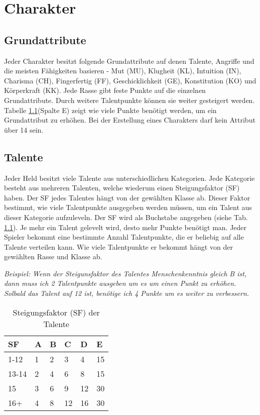 {\let\clearpage\relax\chapter{Charakter}}
\section{Grundattribute}
Jeder Charakter besitzt folgende Grundattribute auf denen Talente, Angriffe und die meisten Fähigkeiten basieren - Mut (MU), Klugheit (KL), Intuition (IN), Charisma (CH), Fingerfertig (FF), Geschicklichkeit (GE), Konstitution (KO) und Körperkraft (KK). Jede Rasse gibt feste Punkte auf die einzelnen Grundattribute. Durch weitere Talentpunkte können sie weiter gesteigert werden. Tabelle \ref{tab:Steigungsfaktor}(Spalte E) zeigt wie viele Punkte benötigt werden, um ein Grundattribut zu erhöhen. Bei der Erstellung eines Charakters darf kein Attribut über 14 sein.

\section{Talente}
Jeder Held besitzt viele Talente aus unterschiedlichen Kategorien. Jede Kategorie besteht aus mehreren Talenten, welche wiederum einen Steigungsfaktor (SF) haben. Der SF jedes Talentes hängt von der gewählten Klasse ab. Dieser Faktor bestimmt, wie viele Talentpunkte ausgegeben werden müssen, um ein Talent aus dieser Kategorie aufzuleveln. Der SF wird als Buchstabe angegeben (siehe Tab. \ref{tab:Steigungsfaktor}). Je mehr ein Talent gelevelt wird, desto mehr Punkte benötigt man. Jeder Spieler bekommt eine bestimmte Anzahl Talentpunkte, die er beliebig auf alle Talente verteilen kann. Wie viele Talentpunkte er bekommt hängt von der gewählten Rasse und Klasse ab.
 
\textit{Beispiel: Wenn der Steigunsfaktor des Talentes Menschenkenntnis gleich B ist, dann muss ich 2 Talentpunkte ausgeben um es um einen Punkt zu erhöhen. Solbald das Talent auf 12 ist, benötige ich 4 Punkte um es weiter zu verbessern.}

\begin{table}[h]
\begin{center}
\begin{tabular}{|l|l|l|l|l|l|}
\hline
\textbf{SF} & \textbf{A} & \textbf{B} & \textbf{C} & \textbf{D} & \textbf{E} \\

\hline
1-12 & 1 & 2 & 3 & 4 & 15 \\

\hline
13-14 & 2 & 4 & 6 & 8 & 15 \\

\hline
15 & 3 & 6 & 9 & 12 & 30 \\

\hline
16+ & 4 & 8 & 12 & 16 & 30 \\

\hline
\end{tabular}
\end{center}
\caption{Steigungsfaktor (SF) der Talente}
\label{tab:Steigungsfaktor}
\end{table}


